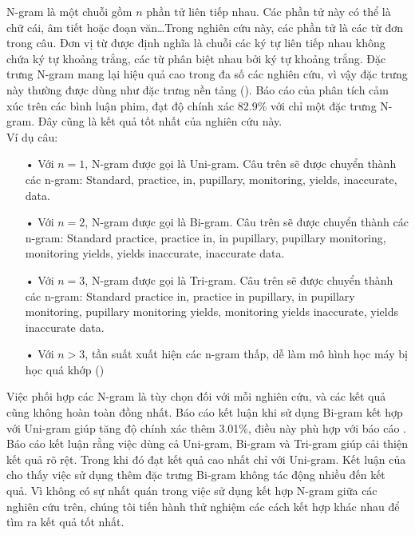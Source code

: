 N-gram là một chuỗi gồm $n$ phần tử liên tiếp nhau. Các phần tử này có thể là chữ cái, âm tiết hoặc đoạn văn\ldots Trong nghiên cứu này, các phần tử là các từ đơn trong câu. Đơn vị từ được định nghĩa là chuỗi các ký tự liên tiếp nhau không chứa ký tự khoảng trắng, các từ phân biệt nhau bởi ký tự khoảng trắng. Đặc trưng N-gram mang lại hiệu quả cao trong đa số các nghiên cứu, vì vậy đặc trưng này thường được dùng như đặc trưng nền tảng (). Báo cáo  của \cite{pang2002thumbs} phân tích cảm xúc trên các bình luận phim, đạt độ chính xác 82.9\% với chỉ một đặc trưng N-gram. Đây cũng là kết quả tốt nhất của nghiên cứu này. \\
Ví dụ câu: 
\begin{itemize}
\item[•]Với $n=1$, N-gram được gọi là Uni-gram. Câu trên sẽ được chuyển thành các n-gram: Standard, practice, in, pupillary, monitoring, yields, inaccurate, data.
\item[•]Với $n=2$, N-gram được gọi là Bi-gram. Câu trên sẽ được chuyển thành các n-gram: Standard practice, practice in, in pupillary, pupillary monitoring, monitoring yields, yields inaccurate, inaccurate data.
\item[•]Với $n=3$, N-gram được gọi là Tri-gram. Câu trên sẽ được chuyển thành các n-gram: Standard practice in, practice in pupillary, in pupillary monitoring, pupillary monitoring yields, monitoring yields inaccurate, yields inaccurate data.
\item[•]Với $n>3$, tần suất xuất hiện các n-gram thấp, dễ làm mô hình học máy bị học quá khớp ()
\end{itemize}
	
Việc phối hợp các N-gram là tùy chọn đối với mỗi nghiên cứu, và các kết quả cũng không hoàn toàn đồng nhất. Báo cáo \cite{niu2005analysis} kết luận khi sử dụng Bi-gram kết hợp với Uni-gram giúp tăng độ chính xác thêm 3.01\%, điều này phù hợp với báo cáo \cite{sarker2011outcome}. Báo cáo \cite{sarker2011outcome} kết luận rằng việc dùng cả Uni-gram, Bi-gram và Tri-gram giúp cải thiện kết quả rõ rệt. Trong khi đó \cite{pang2002thumbs} đạt kết quả cao nhất chỉ với Uni-gram. Kết luận của \cite{pang2002thumbs} cho thấy việc sử dụng thêm đặc trưng Bi-gram không tác động nhiều đến kết quả. Vì không có sự nhất quán trong việc sử dụng kết hợp N-gram giữa các nghiên cứu trên, chúng tôi tiến hành thử nghiệm các cách kết hợp khác nhau để tìm ra kết quả tốt nhất.\\

